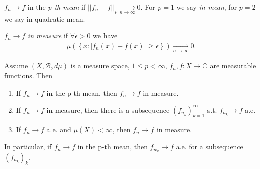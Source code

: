 \(f_n\rightarrow f\) in the \emph{p-th mean} if 
\(\vert \vert f_n-f\vert\vert_p\xrightarrow[n\rightarrow\infty]{ } 0\). For \(p=1\) we say \emph{in mean}, for \(p=2\) we say in 
quadratic mean. 

\(f_n\rightarrow f\) \emph{in measure } if \(\forall\epsilon>0\) we have
\begin{align*}
    \mu\left(\left\{x:\vert f_n(x)-f(x)\vert \geq \epsilon\right\}\right) \xrightarrow[n\rightarrow \infty]{ } 0.
\end{align*}
\begin{theorem}
    Assume \(\left(X, \mathscr{B}, d\mu\right)\) is a measure space, \(1\leq p <\infty\), \(f_n,f:X\rightarrow \mathbb{C}\) are measurable 
    functions. Then
    \begin{enumerate}[label=(\roman*)]
        \item If \(f_n\rightarrow f\) in the p-th mean, then \(f_n\rightarrow f\) in measure.
        \item If \(f_n\rightarrow f\) in measure, then there is a subsequence \((f_{n_k})^{\infty}_{k=1}\) s.t. \(f_{n_k}\rightarrow f\) a.e.
        \item If \(f_n\rightarrow f\) a.e. and \(\mu(X)<\infty\), then \(f_n\rightarrow f\) in measure. 
    \end{enumerate}
    In particular, if \(f_n\rightarrow f\) in the p-th mean, then \(f_{n_k}\rightarrow f\) a.e. for a subsequence \((f_{n_k})_k\).
\end{theorem}